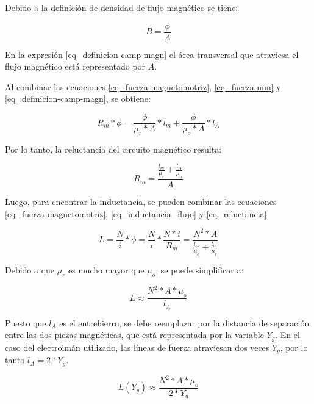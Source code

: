 \noindent Debido a la definición de  densidad de flujo magnético se tiene:

\begin{equation}\label{eq_definicion-camp-magn}
	B=\frac{\phi}{A}
\end{equation}

En la expresión \ref{eq_definicion-camp-magn} el área transversal que atraviesa el flujo magnético está representado por $A$.

Al combinar las ecuaciones \ref{eq_fuerza-magnetomotriz}, \ref{eq_fuerza-mm} y \ref{eq_definicion-camp-magn}, se obtiene:

\begin{equation}
	R_{m}*\phi=\frac{\phi}{\mu_{r}*A}*l_{m}+\frac{\phi}{\mu_{o}*A}*l_{A}
\end{equation}

Por lo tanto, la reluctancia del circuito magnético resulta:

\begin{equation} \label{eq_reluctancia}
	R_{m}=\frac{\frac{l_{m}}{\mu_{r}}+\frac{l_{A}}{\mu_{o}}}{A}
\end{equation}

\noindent Luego, para encontrar la inductancia, se pueden combinar las ecuaciones  \ref{eq_fuerza-magnetomotriz}, \ref{eq_inductancia_flujo} y \ref{eq_reluctancia}:

\begin{equation}\label{eq_inductancia_2}
	L=\frac{N}{i}*\phi=\frac{N}{i}*\frac{N*i}{R_{m}}=\frac{N^{2}*A}{\frac{l_{A}}{\mu_{o}}+\frac{l_{m}}{\mu_{r}}}
\end{equation}

\noindent Debido a que $\mu_{r}$ es mucho mayor que $\mu_{o}$, se puede simplificar a:

\begin{equation} \label{eq_inductancia_gap}
	L\approx\frac{N^{2}*A*\mu_{o}}{l_{A}}
\end{equation}

\noindent \noindent Puesto que $l_{A}$ es el entrehierro, se debe reemplazar por la distancia de separación entre las dos piezas magnéticas, que está representada por la variable $Y_{g}$. En el caso del electroimán utilizado, las líneas de fuerza atraviesan dos veces $Y_{g}$, por lo tanto $l_{A}=2*Y_{g}$.


\begin{equation}\label{eq_inductancia_vs_y}
	L(Y_g)\approx\frac{{N^{2}*A*\mu_{o}}}{2*Y_{g}}
\end{equation}

